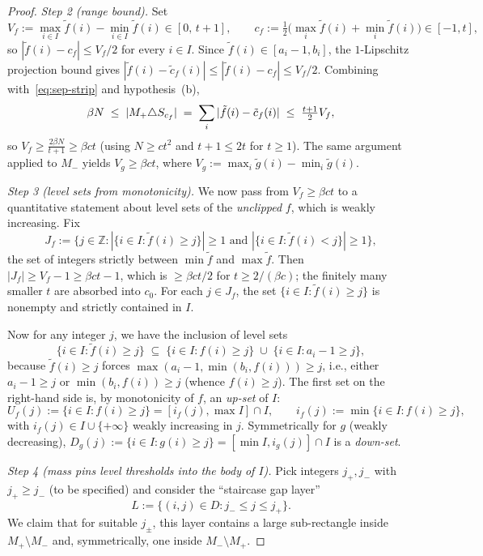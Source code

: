 \begin{proof}
\smallskip
\emph{Step 2 (range bound).} Set
\[
  V_f:=\max_{i\in I}\tilde f(i)-\min_{i\in I}\tilde f(i)\in[0,\,t+1],\qquad
  c_f:=\tfrac12\bigl(\max_i\tilde f(i)+\min_i\tilde f(i)\bigr)\in[-1,t],
\]
so $|\tilde f(i)-c_f|\le V_f/2$ for every $i\in I$. Since $\tilde f(i)\in[a_i-1,b_i]$,
the $1$-Lipschitz projection bound gives $|\tilde f(i)-\tilde c_f(i)|\le|\tilde f(i)-c_f|\le V_f/2$.
Combining with~\eqref{eq:sep-strip} and hypothesis~(b),
\[
  \beta N\;\le\;|M_+\triangle S_{c_f}|\;=\;\sum_i|\tilde f(i)-\tilde c_f(i)|\;\le\;\tfrac{t+1}{2}V_f,
\]
so $V_f\ge\tfrac{2\beta N}{t+1}\ge\beta c t$ (using $N\ge ct^2$ and $t+1\le 2t$ for $t\ge 1$).
The same argument applied to $M_-$ yields $V_g\ge\beta ct$, where
$V_g:=\max_i\tilde g(i)-\min_i\tilde g(i)$.

\smallskip
\emph{Step 3 (level sets from monotonicity).}
We now pass from $V_f\ge\beta ct$ to a quantitative statement about level sets of the
\emph{unclipped} $f$, which is weakly increasing. Fix
\[
  J_f:=\bigl\{j\in\mathbb Z:|\{i\in I:\tilde f(i)\ge j\}|\ge 1
                                   \text{ and }|\{i\in I:\tilde f(i)<j\}|\ge 1\bigr\},
\]
the set of integers strictly between $\min\tilde f$ and $\max\tilde f$. Then
$|J_f|\ge V_f - 1\ge\beta c t - 1$, which is $\ge\beta ct/2$ for $t\ge 2/(\beta c)$;
the finitely many smaller $t$ are absorbed into $c_0$. For each $j\in J_f$, the
set $\{i\in I:\tilde f(i)\ge j\}$ is nonempty and strictly contained in $I$.

Now for any integer $j$, we have the inclusion of level sets
\begin{equation}\label{eq:sep-level-incl}
  \{i\in I:\tilde f(i)\ge j\}\;\subseteq\;\{i\in I:f(i)\ge j\}\;\cup\;\{i\in I:a_i-1\ge j\},
\end{equation}
because $\tilde f(i)\ge j$ forces $\max(a_i-1,\min(b_i,f(i)))\ge j$, i.e., either
$a_i-1\ge j$ or $\min(b_i,f(i))\ge j$ (whence $f(i)\ge j$). The first set on the
right-hand side is, by monotonicity of $f$, an \emph{up-set} of $I$:
\[
  U_f(j):=\{i\in I:f(i)\ge j\}=[i_f(j),\max I]\cap I,\qquad i_f(j):=\min\{i\in I:f(i)\ge j\},
\]
with $i_f(j)\in I\cup\{+\infty\}$ weakly increasing in $j$. Symmetrically for $g$
(weakly decreasing), $D_g(j):=\{i\in I:g(i)\ge j\}=[\min I,i_g(j)]\cap I$ is a
\emph{down-set}.

\smallskip
\emph{Step 4 (mass pins level thresholds into the body of $I$).}
Pick integers $j_+,j_-$ with $j_+\ge j_-$ (to be specified) and consider the ``staircase
gap layer''
\[
  L:=\{(i,j)\in D:j_-\le j\le j_+\}.
\]
We claim that for suitable $j_\pm$, this layer contains a large sub-rectangle inside
$M_+\setminus M_-$ and, symmetrically, one inside $M_-\setminus M_+$.


\end{proof}
